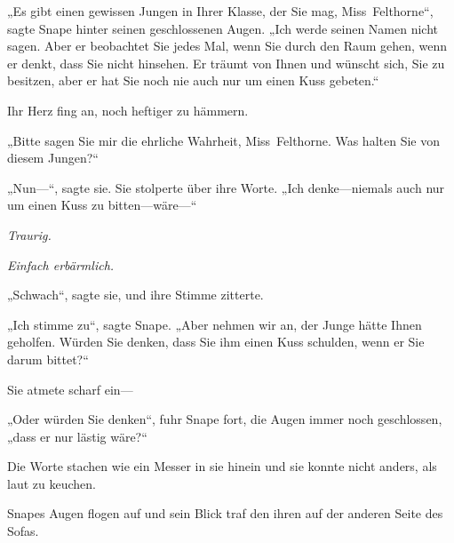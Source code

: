 „Es gibt einen gewissen Jungen in Ihrer Klasse, der Sie mag, Miss~Felthorne“, sagte Snape hinter seinen geschlossenen Augen. „Ich werde seinen Namen nicht sagen. Aber er beobachtet Sie jedes Mal, wenn Sie durch den Raum gehen, wenn er denkt, dass Sie nicht hinsehen. Er träumt von Ihnen und wünscht sich, Sie zu besitzen, aber er hat Sie noch nie auch nur um einen Kuss gebeten.“

Ihr Herz fing an, noch heftiger zu hämmern.

„Bitte sagen Sie mir die ehrliche Wahrheit, Miss~Felthorne. Was halten Sie von diesem Jungen?“

„Nun—“, sagte sie. Sie stolperte über ihre Worte. „Ich denke—niemals auch nur um einen Kuss zu bitten—wäre—“

\emph{Traurig.}

\emph{Einfach erbärmlich.}

„Schwach“, sagte sie, und ihre Stimme zitterte.

„Ich stimme zu“, sagte Snape. „Aber nehmen wir an, der Junge hätte Ihnen geholfen. Würden Sie denken, dass Sie ihm einen Kuss schulden, wenn er Sie darum bittet?“

Sie atmete scharf ein—

„Oder würden Sie denken“, fuhr Snape fort, die Augen immer noch geschlossen, „dass er nur lästig wäre?“

Die Worte stachen wie ein Messer in sie hinein und sie konnte nicht anders, als laut zu keuchen.

Snapes Augen flogen auf und sein Blick traf den ihren auf der anderen Seite des Sofas.

